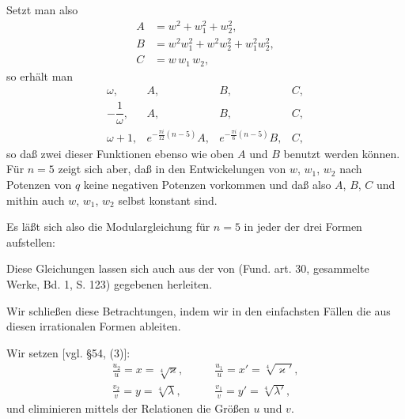 Setzt man also
\[
\begin{aligned}
A &= w^2 + w_1^2 + w_2^2,\\
B &= w^2w_1^2 + w^2w_2^2 + w_1^2w_2^2,\\
C &= w\,w_1\,w_2,
\end{aligned}
\]
so erhält man
\[
\begin{array}{cccc}
\omega, & A, & B, & C, \\
-\dfrac{1}{\omega}, & A, & B, & C, \\
\omega+1, & e^{-\frac{\pi i}{12}(n-5)}A, & e^{-\frac{\pi i}{6}(n-5)}B, & C,
\end{array}
\]
so daß zwei dieser Funktionen ebenso wie oben $A$ und $B$ benutzt
werden können. Für $n=5$ zeigt sich aber, daß in den Entwickelungen
von $w$, $w_1$, $w_2$ nach Potenzen von $q$ keine negativen
Potenzen vorkommen und daß also $A$, $B$, $C$ und mithin auch
$w$, $w_1$, $w_2$ selbst konstant sind.

Es läßt sich also die Modulargleichung für $n=5$ in jeder
der drei Formen aufstellen:

Diese Gleichungen lassen sich auch aus der von 
(Fund. art. 30, gesammelte Werke, Bd. 1, S. 123) gegebenen herleiten.

Wir schließen diese Betrachtungen, indem wir in den einfachsten
Fällen die  aus diesen irrationalen
Formen ableiten.

Wir setzen [vgl. \S 54, (3)]:
\[
\begin{aligned}
\frac{u_2}{u} = x = \sqrt[4]{\varkappa}, &\qquad \frac{u_1}{u} = x' = \sqrt[4]{\varkappa'},\\[6pt]
\frac{v_2}{v} = y = \sqrt[4]{\lambda}, &\qquad \frac{v_1}{v} = y' = \sqrt[4]{\lambda'},
\end{aligned}
\]
und eliminieren mittels der Relationen
die Größen $u$ und $v$.
